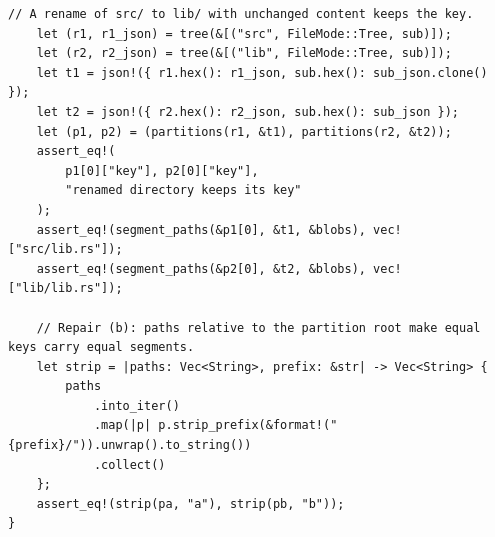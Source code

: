 \documentclass[11pt,letterpaper]{article}
\theoremstyle{definition}
\theoremstyle{remark}
\DeclareRobustCommand{\code}[1]{{\def\_{\textunderscore\allowbreak}\texttt{#1}}}
\begin{document}
\begin{lstlisting}[caption={Scratch integration test of the search partition key, run against commit \code{cfa4845}.},label={lst:pdd:prefixtest}]
    // A rename of src/ to lib/ with unchanged content keeps the key.
    let (r1, r1_json) = tree(&[("src", FileMode::Tree, sub)]);
    let (r2, r2_json) = tree(&[("lib", FileMode::Tree, sub)]);
    let t1 = json!({ r1.hex(): r1_json, sub.hex(): sub_json.clone() });
    let t2 = json!({ r2.hex(): r2_json, sub.hex(): sub_json });
    let (p1, p2) = (partitions(r1, &t1), partitions(r2, &t2));
    assert_eq!(
        p1[0]["key"], p2[0]["key"],
        "renamed directory keeps its key"
    );
    assert_eq!(segment_paths(&p1[0], &t1, &blobs), vec!["src/lib.rs"]);
    assert_eq!(segment_paths(&p2[0], &t2, &blobs), vec!["lib/lib.rs"]);

    // Repair (b): paths relative to the partition root make equal keys carry equal segments.
    let strip = |paths: Vec<String>, prefix: &str| -> Vec<String> {
        paths
            .into_iter()
            .map(|p| p.strip_prefix(&format!("{prefix}/")).unwrap().to_string())
            .collect()
    };
    assert_eq!(strip(pa, "a"), strip(pb, "b"));
}
\end{lstlisting}
\end{document}
